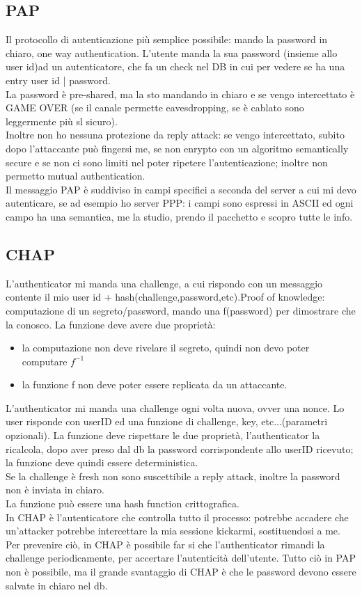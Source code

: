 \documentclass[16px]{article}
\begin{document}
\subsection{PAP}
Il protocollo di autenticazione più semplice possibile: mando la password in chiaro, one way authentication. L'utente manda la sua password (insieme allo user id)ad un autenticatore, che fa un check nel DB in cui per vedere se ha una entry user id | password.\\ La password è pre-shared, ma la sto mandando in chiaro e se vengo intercettato è GAME OVER (se il canale permette eavesdropping, se è cablato sono leggermente più sl sicuro).\\ Inoltre non ho nessuna protezione da reply attack: se vengo intercettato, subito dopo l'attaccante può fingersi me, se non enrypto con un algoritmo semantically secure e se non ci sono limiti nel poter ripetere l'autenticazione; inoltre non permetto mutual authentication.\\ Il messaggio PAP è suddiviso in campi specifici a seconda del server a cui mi devo autenticare, se ad esempio ho server PPP: i campi sono espressi in ASCII ed ogni campo ha una semantica, me la studio, prendo il  pacchetto e scopro tutte le info.
\subsection{CHAP}
L'authenticator mi manda una challenge, a cui rispondo con un messaggio contente il mio user id + hash(challenge,password,etc).Proof of knowledge: computazione di un segreto/password, mando una f(password) per dimostrare che la conosco. La funzione deve avere due proprietà:
\begin{itemize}
\item la computazione non deve rivelare il segreto, quindi non devo poter computare $f^{-1}$
\item la funzione f non deve poter essere replicata da un attaccante.
\end{itemize}
L'authenticator mi manda una challenge ogni volta nuova, ovver una nonce. Lo user risponde con userID ed una funzione di challenge, key, etc...(parametri opzionali). La funzione deve rispettare le due proprietà, l'authenticator la ricalcola, dopo aver preso dal db la password corrispondente allo userID ricevuto; la funzione deve quindi essere deterministica.\\ Se la challenge è fresh non sono suscettibile a reply attack, inoltre la password non è inviata in chiaro.\\ La funzione può essere una hash function crittografica.\\ In CHAP è l'autenticatore che controlla tutto il processo: potrebbe accadere che un'attacker potrebbe intercettare la mia sessione kickarmi, sostituendosi a me. Per prevenire ciò, in CHAP è possibile far si che l'authenticator rimandi la challenge periodicamente, per accertare l'autenticità dell'utente. Tutto ciò in PAP non è possibile, ma il grande svantaggio di CHAP è che le password devono essere salvate in chiaro nel db.
\end{document}

